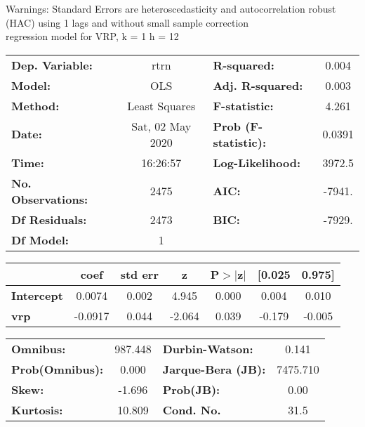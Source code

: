 Warnings: \newline
 [1] Standard Errors are heteroscedasticity and autocorrelation robust (HAC) using 1 lags and without small sample correction\\ 

regression model for VRP, k = 1 h = 12\begin{center}
\begin{tabular}{lclc}
\toprule
\textbf{Dep. Variable:}    &       rtrn       & \textbf{  R-squared:         } &     0.004   \\
\textbf{Model:}            &       OLS        & \textbf{  Adj. R-squared:    } &     0.003   \\
\textbf{Method:}           &  Least Squares   & \textbf{  F-statistic:       } &     4.261   \\
\textbf{Date:}             & Sat, 02 May 2020 & \textbf{  Prob (F-statistic):} &   0.0391    \\
\textbf{Time:}             &     16:26:57     & \textbf{  Log-Likelihood:    } &    3972.5   \\
\textbf{No. Observations:} &        2475      & \textbf{  AIC:               } &    -7941.   \\
\textbf{Df Residuals:}     &        2473      & \textbf{  BIC:               } &    -7929.   \\
\textbf{Df Model:}         &           1      & \textbf{                     } &             \\
\bottomrule
\end{tabular}
\begin{tabular}{lcccccc}
                   & \textbf{coef} & \textbf{std err} & \textbf{z} & \textbf{P$> |$z$|$} & \textbf{[0.025} & \textbf{0.975]}  \\
\midrule
\textbf{Intercept} &       0.0074  &        0.002     &     4.945  &         0.000        &        0.004    &        0.010     \\
\textbf{vrp}       &      -0.0917  &        0.044     &    -2.064  &         0.039        &       -0.179    &       -0.005     \\
\bottomrule
\end{tabular}
\begin{tabular}{lclc}
\textbf{Omnibus:}       & 987.448 & \textbf{  Durbin-Watson:     } &    0.141  \\
\textbf{Prob(Omnibus):} &   0.000 & \textbf{  Jarque-Bera (JB):  } & 7475.710  \\
\textbf{Skew:}          &  -1.696 & \textbf{  Prob(JB):          } &     0.00  \\
\textbf{Kurtosis:}      &  10.809 & \textbf{  Cond. No.          } &     31.5  \\
\bottomrule
\end{tabular}
\end{center}

